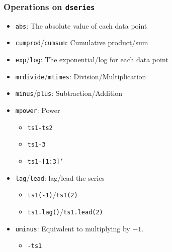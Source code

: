 \documentclass[10pt]{beamer}
\newcommand{\myitem}{\item[$\bullet$]}
\begin{document}
\begin{frame}[fragile,t]
  \frametitle{Operations on \texttt{dseries}}
  \begin{itemize}
  \myitem \texttt{abs}: The absolute value of each data point
  \myitem \texttt{cumprod}/\texttt{cumsum}: Cumulative product/sum
  \myitem \texttt{exp}/\texttt{log}: The exponential/log for each data point
  \myitem \texttt{mrdivide}/\texttt{mtimes}: Division/Multiplication
  \myitem \texttt{minus}/\texttt{plus}: Subtraction/Addition
  \myitem \texttt{mpower}: Power
    \begin{itemize}
    \myitem \texttt{ts1-ts2}
    \myitem \texttt{ts1-3}
    \myitem \texttt{ts1-[1:3]'}
    \end{itemize}
  \myitem \texttt{lag}/\texttt{lead}: lag/lead the series
    \begin{itemize}
    \myitem \texttt{ts1(-1)}/\texttt{ts1(2)}
    \myitem \texttt{ts1.lag()}/\texttt{ts1.lead(2)}
    \end{itemize}
  \myitem \texttt{uminus}: Equivalent to multiplying by $-1$.
    \begin{itemize}
    \myitem \texttt{-ts1}
    \end{itemize}
  \end{itemize}
\end{frame}
\end{document}
